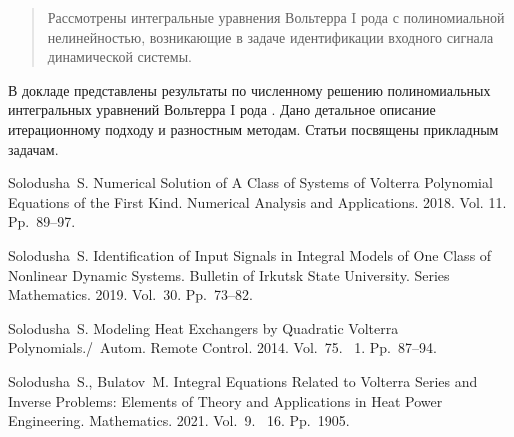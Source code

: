 \maketitle

\begin{abstract}
Рассмотрены интегральные уравнения Вольтерра I рода с полиномиальной нелинейностью, возникающие в задаче идентификации входного сигнала динамической системы.

\end{abstract}


В докладе представлены результаты по численному решению полиномиальных интегральных уравнений Вольтерра I рода \cite{solodusha1,solodusha2}. Дано детальное описание итерационному подходу и разностным методам. Статьи \cite{solodusha3,solodusha4}  посвящены прикладным задачам.




%

\begin{thebibliography}{9} %
  Solodusha~S. Numerical Solution of A Class of Systems of Volterra Polynomial Equations of the First Kind. Numerical Analysis and Applications. 2018. Vol. 11. Pp.~89--97. 

  Solodusha~S. Identification of Input Signals in Integral Models of One Class of Nonlinear  Dynamic Systems. Bulletin of Irkutsk State University. Series Mathematics. 2019. Vol.~30. Pp.~73--82.

 Solodusha~S. Modeling Heat Exchangers by Quadratic Volterra Polynomials./~Autom. Remote Control. 2014. Vol.~75.  \textnumero~1. Pp.~87--94.  

 Solodusha~S., Bulatov~M. Integral Equations Related to Volterra Series and Inverse Problems:
Elements of Theory and Applications in Heat Power Engineering. Mathematics. 2021. Vol.~9.  \textnumero~16. Pp.~1905. 

\end{thebibliography}





%
